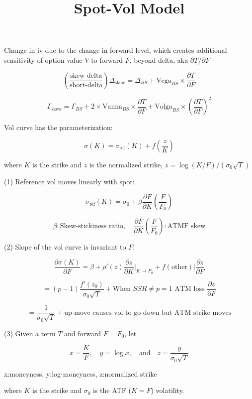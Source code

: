 \documentclass[12pt]{article}
\title{Spot-Vol Model}
\date{}
\begin{document}
\maketitle

Change in iv due to the change in forward level, which creates additional sensitivity of option value \(V\) to forward \(F\), beyond delta, aka \(\partial T/\partial F\)

\[
\left(\frac{\text{skew-delta}}{\text{short-delta}}\right) \Delta_{\text{skew}} = \Delta_{BS} + \text{Vega}_{BS} \times \frac{\partial T}{\partial F}
\]

\[
\Gamma_{\text{skew}} = \Gamma_{BS} + 2 \times \text{Vanna}_{BS} \times \frac{\partial T}{\partial F} + \text{Volga}_{BS} \times \left(\frac{\partial T}{\partial F}\right)^2
\]

Vol curve has the parameterization:

\[
\sigma(K) = \sigma_{\text{ref}}(K) + f\left(\frac{z}{K}\right)
\]

where \(K\) is the strike and \(z\) is the normalized strike, \(z = \log(K/F)/(\sigma_0\sqrt{T})\)

(1) Reference vol moves linearly with spot:

\[
\sigma_{\text{ref}}(K) = \sigma_0 + \beta \frac{\partial F}{\partial K} \left(\frac{F}{F_0}\right)
\]

\[
\beta: \text{Skew-stickiness ratio}, \quad \frac{\partial F}{\partial K} \left(\frac{F}{F_0}\right): \text{ATMF skew}
\]

(2) Slope of the vol curve is invariant to \(F\):

\[
\frac{\partial \sigma(K)}{\partial F} = \beta + \rho'(z) \frac{\partial z}{\partial K} \bigg|_{K \rightarrow F_0} + f(\text{other}) \bigg| \frac{\partial z}{\partial F}
\]

\[
= (p-1) \frac{f'(z_0)}{\sigma_0\sqrt{T}} + \text{When } SSR \neq p=1 \text{ ATM loss } \frac{\partial z}{\partial F}
\]

\[
= \frac{1}{\sigma_0\sqrt{T}} + \text{up-move causes vol to go down but ATM strike moves}
\]

(3) Given a term \(T\) and forward \(F=F_0\), let

\[
x = \frac{K}{F}, \quad y = \log x, \quad \text{and} \quad z = \frac{y}{\sigma_0\sqrt{T}}
\]

x:moneyness, y:log-moneyness, z:normalized strike

where \(K\) is the strike and \(\sigma_0\) is the ATF (\(K=F\)) volatility.
\end{document}
